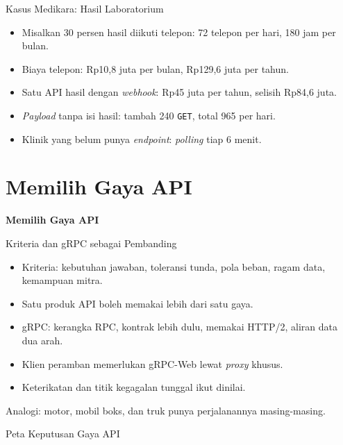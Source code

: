 \documentclass[aspectratio=169, table, 12pt]{beamer}
\begin{document}
\begin{frame}{{\Large Kasus Medikara: Hasil Laboratorium}}
  \vspace{10pt}
  \begin{itemize}
    \item Misalkan 30 persen hasil diikuti telepon: 72 telepon per hari, 180 jam per bulan.
    \item Biaya telepon: Rp10,8 juta per bulan, Rp129,6 juta per tahun.
    \item Satu API hasil dengan \textit{webhook}: Rp45 juta per tahun, selisih Rp84,6 juta.
    \item \textit{Payload} tanpa isi hasil: tambah 240 \texttt{GET}, total 965 per hari.
    \item Klinik yang belum punya \textit{endpoint}: \textit{polling} tiap 6 menit.
  \end{itemize}
\end{frame}

\section{Memilih Gaya API}

\begin{frame}{\hfill}
  \centering
  \Huge{\textbf{Memilih Gaya API}}
\end{frame}

\begin{frame}{{\Large Kriteria dan gRPC sebagai Pembanding}}
  \vspace{10pt}
  \begin{itemize}
    \item Kriteria: kebutuhan jawaban, toleransi tunda, pola beban, ragam data, kemampuan mitra.
    \item Satu produk API boleh memakai lebih dari satu gaya.
    \item gRPC: kerangka RPC, kontrak lebih dulu, memakai HTTP/2, aliran data dua arah.
    \item Klien peramban memerlukan gRPC-Web lewat \textit{proxy} khusus.
    \item Keterikatan dan titik kegagalan tunggal ikut dinilai.
  \end{itemize}
  \vspace{6pt}
  {\small Analogi: motor, mobil boks, dan truk punya perjalanannya masing-masing.}
\end{frame}

\begin{frame}{{\Large Peta Keputusan Gaya API}}
  \centering
  \resizebox{!}{0.8\textheight}{}
\end{frame}
\end{document}
